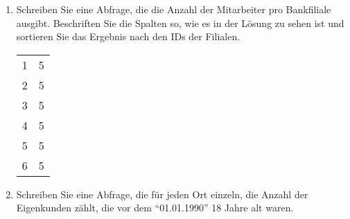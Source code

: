\begin{enumerate}
\begin{center}
        \end{center}
        \item Schreiben Sie eine Abfrage, die die Anzahl der Mitarbeiter pro
        Bankfiliale ausgibt. Beschriften Sie die Spalten so, wie es in der
        L\"osung zu sehen ist und sortieren Sie das Ergebnis nach den IDs der
        Filialen.
        \begin{center}
          \begin{small}
            \tablehead{}
            \begin{msoraclesql}
              \begin{supertabular}{rr}
                1 & 5 \\
                2 & 5 \\
                3 & 5 \\
                4 & 5 \\
                5 & 5 \\
                6 & 5 \\
             \end{supertabular}
            \end{msoraclesql}
          \end{small}
        \end{center}
\clearpage
        \item Schreiben Sie eine Abfrage, die f\"ur jeden Ort einzeln, die
        Anzahl der Eigenkunden z\"ahlt, die vor dem \enquote{01.01.1990} 18
        Jahre alt waren.
        \begin{center}
          \begin{small}
            \tablehead{}
            \tabletail {
            }
            \tablelasttail {
}
\end{small}
\end{center}
\end{enumerate}
